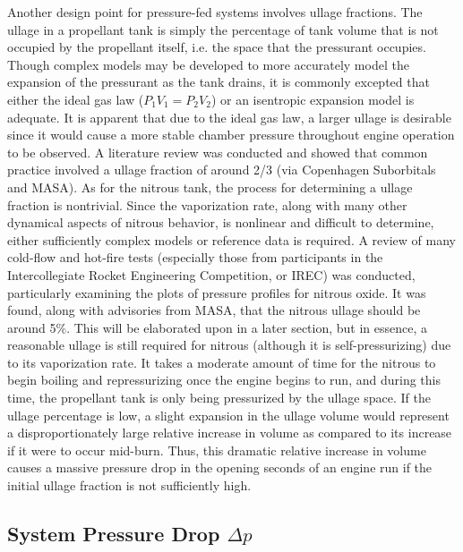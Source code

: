 \documentclass[9pt]{article} %
\numberwithin{equation}{section} %
\begin{document}
Another design point for pressure-fed systems involves ullage fractions. The ullage in a propellant tank is simply the percentage of tank volume that is not occupied by the propellant itself, i.e. the space that the pressurant occupies. Though complex models may be developed to more accurately model the expansion of the pressurant as the tank drains, it is commonly excepted that either the ideal gas law ($P_{1}V_{1} = P_{2}V_{2}$) or an isentropic expansion model is adequate. It is apparent that due to the ideal gas law, a larger ullage is desirable since it would cause a more stable chamber pressure throughout engine operation to be observed. A literature review was conducted and showed that common practice involved a ullage fraction of around 2/3 (via Copenhagen Suborbitals and MASA). As for the nitrous tank, the process for determining a ullage fraction is nontrivial. Since the vaporization rate, along with many other dynamical aspects of nitrous behavior, is nonlinear and difficult to determine, either sufficiently complex models or reference data is required. A review of many cold-flow and hot-fire tests (especially those from participants in the Intercollegiate Rocket Engineering Competition, or IREC) was conducted, particularly examining the plots of pressure profiles for nitrous oxide. It was found, along with advisories from MASA, that the nitrous ullage should be around 5\%. This will be elaborated upon in a later section, but in essence, a reasonable ullage is still required for nitrous (although it is self-pressurizing) due to its vaporization rate. It takes a moderate amount of time for the nitrous to begin boiling and repressurizing once the engine begins to run, and during this time, the propellant tank is only being pressurized by the ullage space. If the ullage percentage is low, a slight expansion in the ullage volume would represent a disproportionately large relative increase in volume as compared to its increase if it were to occur mid-burn. Thus, this dramatic relative increase in volume causes a massive pressure drop in the opening seconds of an engine run if the initial ullage fraction is not sufficiently high.

\subsection{System Pressure Drop $\Delta p$}
\end{document}
